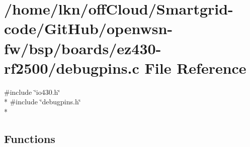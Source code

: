 \hypertarget{ez430-rf2500_2debugpins_8c}{}\section{/home/lkn/off\+Cloud/\+Smartgrid-\/code/\+Git\+Hub/openwsn-\/fw/bsp/boards/ez430-\/rf2500/debugpins.c File Reference}
\label{ez430-rf2500_2debugpins_8c}
{\ttfamily \#include \char`\"{}io430.\+h\char`\"{}}\\*
{\ttfamily \#include \char`\"{}debugpins.\+h\char`\"{}}\\*
\subsection*{Functions}
